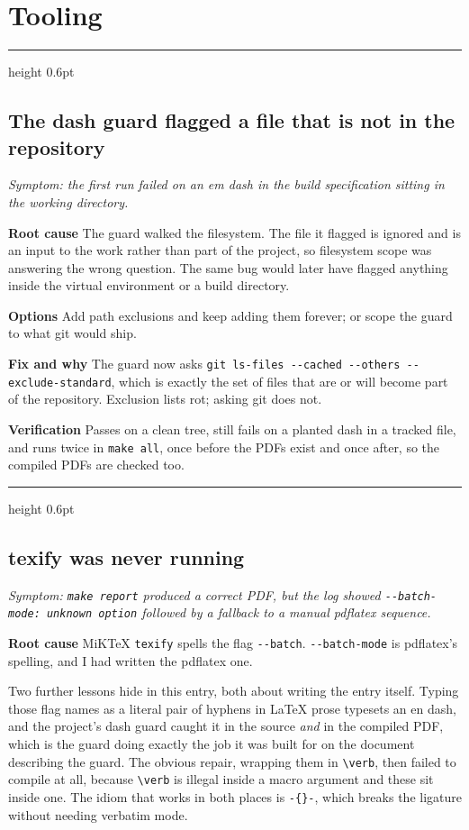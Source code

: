 \documentclass[11pt,a4paper]{article}
\newcommand{\entry}[2]{%
  \vspace{0.6em}%
  {\color{rulegrey}\hrule height 0.6pt}%
  \vspace{0.5em}%
  \subsection*{#1}%
  \textit{\small #2}\par\vspace{0.3em}%
}
\newcommand{\field}[1]{\vspace{0.35em}\textbf{#1}\quad}
\begin{document}
\section{Tooling}

\entry{The dash guard flagged a file that is not in the repository}{Symptom: the
first run failed on an em dash in the build specification sitting in the working
directory.}

\field{Root cause} The guard walked the filesystem. The file it flagged is
ignored and is an input to the work rather than part of the project, so
filesystem scope was answering the wrong question. The same bug would later have
flagged anything inside the virtual environment or a build directory.

\field{Options} Add path exclusions and keep adding them forever; or scope the
guard to what git would ship.

\field{Fix and why} The guard now asks
\verb|git ls-files --cached --others --exclude-standard|, which is exactly the
set of files that are or will become part of the repository. Exclusion lists rot;
asking git does not.

\field{Verification} Passes on a clean tree, still fails on a planted dash in a
tracked file, and runs twice in \texttt{make all}, once before the PDFs exist and
once after, so the compiled PDFs are checked too.

\entry{texify was never running}{Symptom: \texttt{make report} produced a correct
PDF, but the log showed \texttt{-{}-batch-mode: unknown option} followed by a
fallback to a manual pdflatex sequence.}

\field{Root cause} MiKTeX \texttt{texify} spells the flag \texttt{-{}-batch}.
\texttt{-{}-batch-mode} is pdflatex's spelling, and I had written the pdflatex
one.

Two further lessons hide in this entry, both about writing the entry itself.
Typing those flag names as a literal pair of hyphens in LaTeX prose typesets an
en dash, and the project's dash guard caught it in the source \emph{and} in the
compiled PDF, which is the guard doing exactly the job it was built for on the
document describing the guard. The obvious repair, wrapping them in
\texttt{\textbackslash verb}, then failed to compile at all, because
\texttt{\textbackslash verb} is illegal inside a macro argument and these sit
inside one. The idiom that works in both places is \texttt{-\{\}-}, which breaks
the ligature without needing verbatim mode.
\end{document}
